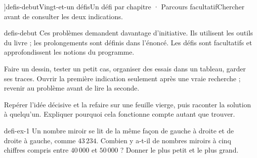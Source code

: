 \editionPage[\pdfbookmark[0]{Défis d’approfondissement}{bm-defis-debut-parent}]{defis-debut}{Vingt-et-un défis}{Un défi par chapitre · Parcours facultatif}{Chercher avant de consulter les deux indications.}
\begin{blocEdition}{defis-debut}
Ces problèmes demandent davantage d’initiative. Ils utilisent les outils du livre ; les prolongements sont définis dans l’énoncé. Les défis sont facultatifs et approfondissent les notions du programme.\par\bigskip
\begin{savoirfaire}Faire un dessin, tester un petit cas, organiser des essais dans un tableau, garder ses traces. Ouvrir la première indication seulement après une vraie recherche ; revenir au problème avant de lire la seconde.\end{savoirfaire}
\begin{savoirfaire}Repérer l’idée décisive et la refaire sur une feuille vierge, puis raconter la solution à quelqu’un. Expliquer pourquoi cela fonctionne compte autant que trouver.\end{savoirfaire}
\end{blocEdition}
\begin{blocEdition}{defi-ex-1}
Un nombre miroir se lit de la même façon de gauche à droite et de droite à gauche, comme $43\,234$. Combien y a-t-il de nombres miroirs à cinq chiffres compris entre $40\,000$ et $50\,000$ ? Donner le plus petit et le plus grand.\par{}\par\par{}\par{}\par{}\par{}\par{}\par{}
\end{blocEdition}
